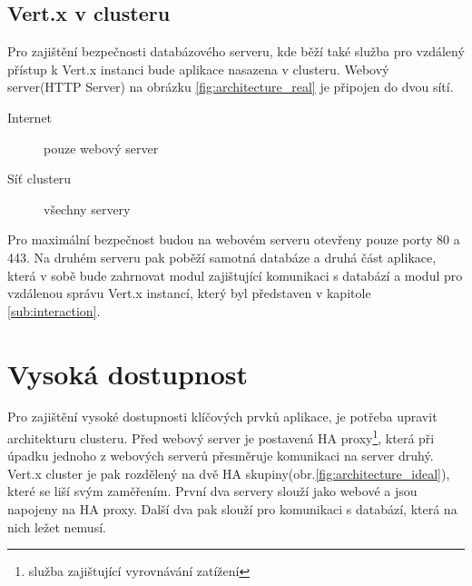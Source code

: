 \subsection{Vert.x v clusteru}\label{sub:praktCluster}

Pro zajištění bezpečnosti databázového serveru, kde běží také služba pro vzdálený přístup k Vert.x instanci bude aplikace nasazena v clusteru. Webový server(HTTP Server) na obrázku \ref{fig:architecture_real} je připojen do dvou sítí.

\begin{description}
\item[Internet] pouze webový server
\item[Síť clusteru] všechny servery
\end{description}

Pro maximální bezpečnost budou na webovém serveru otevřeny pouze porty 80 a 443. Na druhém serveru pak poběží samotná databáze a druhá část aplikace, která v sobě bude zahrnovat modul zajištující komunikaci s databází a modul pro vzdálenou správu Vert.x instancí, který byl představen v kapitole \ref{sub:interaction}.

\section{Vysoká dostupnost}

Pro zajištění vysoké dostupnosti klíčových prvků aplikace, je potřeba upravit architekturu clusteru. Před webový server je postavená HA proxy\footnote{služba zajištující vyrovnávání zatížení}, která při úpadku jednoho z webových serverů přesměruje komunikaci na server druhý. Vert.x cluster je pak rozdělený na dvě HA skupiny(obr.\ref{fig:architecture_ideal}), které se liší svým zaměřením. První dva servery slouží jako webové a jsou napojeny na HA proxy. Další dva pak slouží pro komunikaci s databází, která na nich ležet nemusí.

